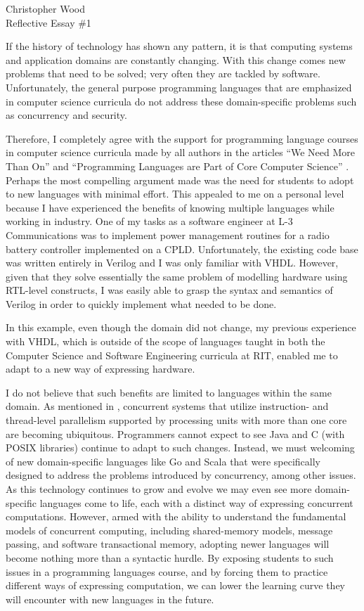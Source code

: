 \documentclass[12pt,letterpaper]{article}
\begin{document}
\begin{center}
Christopher Wood \\
Reflective Essay \#1 \\
\end{center}

If the history of technology has shown any pattern, it is that computing systems and application domains are constantly changing. With this change comes new problems that need to be solved; very often they are tackled by software. Unfortunately, the general purpose programming languages that are emphasized in computer science curricula do not address these domain-specific problems such as concurrency and security. 

Therefore, I completely agree with the support for programming language courses in computer science curricula made by all authors in the articles ``We Need More Than On'' \cite{Fisher} and ``Programming Languages are Part of Core Computer Science'' \cite{Bruce}. Perhaps the most compelling argument made was the need for students to adopt to new languages with minimal effort. This appealed to me on a personal level because I have experienced the benefits of knowing multiple languages while working in industry. One of my tasks as a software engineer at L-3 Communications was to implement power management routines for a radio battery controller implemented on a CPLD. Unfortunately, the existing code base was written entirely in Verilog and I was only familiar with VHDL. However, given that they solve essentially the same problem of modelling hardware using RTL-level constructs, I was easily able to grasp the syntax and semantics of Verilog in order to quickly implement what needed to be done. 

In this example, even though the domain did not change, my previous experience with VHDL, which is outside of the scope of languages taught in both the Computer Science and Software Engineering curricula at RIT, enabled me to adapt to a new way of expressing hardware. 

I do not believe that such benefits are limited to languages within the same domain. As mentioned in \cite{Fisher}, concurrent systems that utilize instruction- and thread-level parallelism supported by processing units with more than one core are becoming ubiquitous. Programmers cannot expect to see Java and C (with POSIX libraries) continue to adapt to such changes. Instead, we must welcoming of new domain-specific languages like Go and Scala that were specifically designed to address the problems introduced by concurrency, among other issues. As this technology continues to grow and evolve we may even see more domain-specific languages come to life, each with a distinct way of expressing concurrent computations. However, armed with the ability to understand the fundamental models of concurrent computing, including shared-memory models, message passing, and software transactional memory, adopting newer languages will become nothing more than a syntactic hurdle. By exposing students to such issues in a programming languages course, and by forcing them to practice different ways of expressing computation, we can lower the learning curve they will encounter with new languages in the future.
\end{document}
